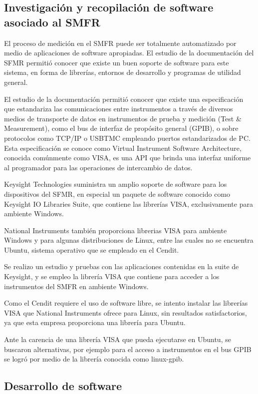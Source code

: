 \documentclass[paper=letter,oneside,fontsize=12pt, parskip=full]{article}
\begin{document}
	\subsection{Investigación y recopilación de software asociado al SMFR}
	
	El proceso de medición en el SMFR puede ser totalmente automatizado por medio de aplicaciones de software apropiadas. El estudio de la documentación del SFMR permitió conocer que existe un buen soporte de software para este sistema, en forma de librerías, entornos de desarrollo y programas de utilidad general.
	
	El estudio de la documentación permitió conocer que existe una especificación que estandariza las comunicaciones entre instrumentos a través de diversos medios de transporte de datos en instrumentos de prueba y medición (Test \& Measurement), como  el bus de interfaz de propósito general (GPIB), o sobre protocolos como TCP/IP o USBTMC empleando puertos estandarizados de PC. Esta especificación se conoce como Virtual Instrument Software Architecture, conocida comúnmente como VISA, es una API que brinda una interfaz uniforme al programador para las operaciones de intercambio de datos. 
	
	Keysight Technologies suministra un amplio soporte de software para los dispositivos del SFMR, en especial un paquete de software conocido como Keysight IO Libraries Suite, que contiene las librerías VISA, exclusivamente para ambiente Windows. 
	
	National Instruments también proporciona librerias VISA para ambiente Windows y para algunas distribuciones de Linux, entre las cuales no se encuentra Ubuntu, 
	sistema operativo que se empleado en el Cendit.
	
	Se realizo un estudio y pruebas con las aplicaciones contenidas en la suite de Keysight, y se empleo la librería VISA que contiene para acceder a los instrumentos del SMFR en ambiente Windows.
	
	Como el Cendit requiere el uso de software libre, se intento instalar las librerías VISA que National Instruments ofrece para Linux, sin resultados satisfactorios, ya que esta empresa proporciona una librería para Ubuntu.	
	
	Ante la carencia de una librería VISA que pueda ejecutarse en Ubuntu, se buscaron alternativas, por ejemplo para el acceso a instrumentos en el bus GPIB se logró por medio de la librería conocida como linux-gpib.
	
	\subsection{Desarrollo de software}
	
\end{document}
